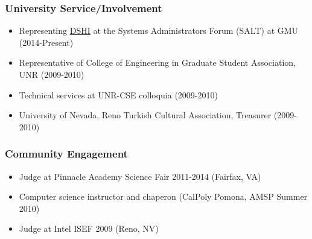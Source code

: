 \documentclass[11pt, letter]{article}
\begin{document}
\begin{raggedright}
\subsubsection{University
Service/Involvement}\label{university-serviceinvolvement}

\begin{itemize}
\itemsep1pt\parskip0pt
\item
  Representing \href{http://dshi.gmu.edu/}{DSHI} at the Systems
  Administrators Forum (SALT) at GMU (2014-Present)
\item
  Representative of College of Engineering in Graduate Student
  Association, UNR (2009-2010)
\item
  Technical services at UNR-CSE colloquia (2009-2010)
\item
  University of Nevada, Reno Turkish Cultural Association, Treasurer
  (2009-2010)
\end{itemize}

\subsubsection{Community Engagement}\label{community-engagement}

\begin{itemize}
\itemsep1pt\parskip0pt
\item
  Judge at Pinnacle Academy Science Fair 2011-2014 (Fairfax, VA)
\item
  Computer science instructor and chaperon (CalPoly Pomona, AMSP Summer
  2010)
\item
  Judge at Intel ISEF 2009 (Reno, NV)
\end{itemize}



\end{raggedright}
\end{document}
